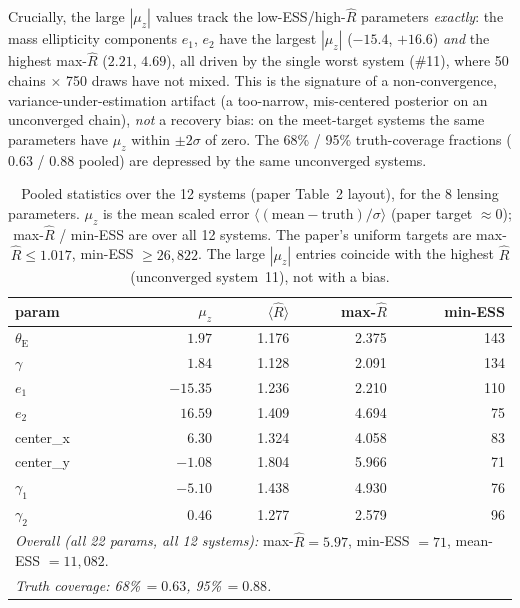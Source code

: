 \documentclass[11pt,letterpaper]{article}
\newcommand{\thetaE}{\ensuremath{\theta_{\mathrm{E}}}}
\newcommand{\Rhat}{\ensuremath{\hat{R}}}
\newcommand{\muz}{\ensuremath{\mu_z}}
\begin{document}
Crucially, the large $|\muz|$ values track the low-ESS/high-$\Rhat$
parameters \emph{exactly}: the mass ellipticity components $e_1$, $e_2$ have
the largest $|\muz|$ ($-15.4$, $+16.6$) \emph{and} the highest max-$\Rhat$
($2.21$, $4.69$), all driven by the single worst system (\#11), where 50
chains $\times$ 750 draws have not mixed. This is the signature of a
non-convergence, variance-under-estimation artifact (a too-narrow,
mis-centered posterior on an unconverged chain), \emph{not} a recovery bias:
on the meet-target systems the same parameters have $\muz$ within
$\pm2\sigma$ of zero. The 68\% / 95\% truth-coverage fractions ($0.63$ /
$0.88$ pooled) are depressed by the same unconverged systems.

\begin{table}[ht]
\centering
\caption{Pooled statistics over the 12 systems (paper Table~2 layout), for
the 8 lensing parameters. $\muz$ is the mean scaled error
$\langle(\mathrm{mean}-\mathrm{truth})/\sigma\rangle$ (paper target
$\approx0$); max-$\Rhat$ / min-ESS are over all 12 systems. The paper's
uniform targets are max-$\Rhat\le1.017$, min-ESS $\ge26{,}822$. The large
$|\muz|$ entries coincide with the highest $\Rhat$ (unconverged system~11),
not with a bias.}
\label{tab:pooled}
\begin{tabular}{lrrrr}
\toprule
param & $\muz$ & $\langle\Rhat\rangle$ & max-$\Rhat$ & min-ESS \\
\midrule
\thetaE     &  $1.97$  & 1.176 & 2.375 & 143 \\
$\gamma$    &  $1.84$  & 1.128 & 2.091 & 134 \\
$e_1$       & $-15.35$ & 1.236 & 2.210 & 110 \\
$e_2$       &  $16.59$ & 1.409 & 4.694 & 75  \\
center\_x   &  $6.30$  & 1.324 & 4.058 & 83  \\
center\_y   & $-1.08$  & 1.804 & 5.966 & 71  \\
$\gamma_1$  & $-5.10$  & 1.438 & 4.930 & 76  \\
$\gamma_2$  &  $0.46$  & 1.277 & 2.579 & 96  \\
\midrule
\multicolumn{5}{l}{\emph{Overall (all 22 params, all 12 systems):}
  max-$\Rhat=5.97$, min-ESS $=71$, mean-ESS $=11{,}082$.}\\
\multicolumn{5}{l}{\emph{Truth coverage: 68\%\,$=0.63$, 95\%\,$=0.88$.}}\\
\bottomrule
\end{tabular}
\end{table}
\end{document}
